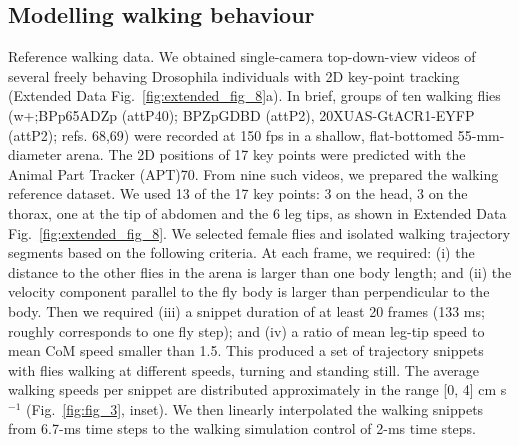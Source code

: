 \documentclass[sn-mathphys-num]{sn-jnl}%
\theoremstyle{thmstyleone}	%
\theoremstyle{thmstyletwo}	%
\theoremstyle{thmstylethree}	%
\begin{document}
\subsection{Modelling walking behaviour}

Reference walking data. We obtained single-camera top-down-view videos of several freely behaving Drosophila individuals with 2D key-point tracking\cite{robie2024fly} (Extended Data Fig.~\ref{fig:extended_fig_8}a). 
In brief, groups of ten walking flies (w+;BPp65ADZp (attP40); BPZpGDBD (attP2), 20XUAS-GtACR1-EYFP (attP2); refs. 68,69) were recorded at 150 fps in a shallow, flat-bottomed 55-mm-diameter arena.
The 2D positions of 17 key points were predicted with the Animal Part Tracker (APT)70. 
From nine such videos, we prepared the walking reference dataset. 
We used 13 of the 17 key points: 3 on the head, 3 on the thorax, one at the tip of abdomen and the 6 leg tips, as shown in Extended Data Fig.~\ref{fig:extended_fig_8}. 
We selected female flies and isolated walking trajectory segments based on the following criteria. 
At each frame, we required: (i) the distance to the other flies in the arena is larger than one body length; and (ii) the velocity component parallel to the fly body is larger than perpendicular to the body. 
Then we required (iii) a snippet duration of at least 20 frames (133 ms; roughly corresponds to one fly step); 
and (iv) a ratio of mean leg-tip speed to mean CoM speed smaller than 1.5. 
This produced a set of trajectory snippets with flies walking at different speeds, turning and standing still. 
The average walking speeds per snippet are distributed approximately in the range [0, 4] cm s$ ^{-1} $ (Fig.~\ref{fig:fig_3}, inset). 
We then linearly interpolated the walking snippets from 6.7-ms time steps to the walking simulation control of 2-ms time steps.
\end{document}
